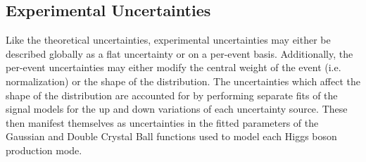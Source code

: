 \subsection{Experimental Uncertainties}
Like the theoretical uncertainties, experimental uncertainties may either be described globally as a flat uncertainty or on a per-event basis.
Additionally, the per-event uncertainties may either modify the central weight of the event (i.e. normalization) or the shape of the \mgg distribution.
The uncertainties which affect the shape of the \mgg distribution are accounted for by performing separate fits of the signal models for the up and down variations of each uncertainty source.
These then manifest themselves as uncertainties in the fitted parameters of the Gaussian and Double Crystal Ball functions used to model each Higgs boson production mode.

